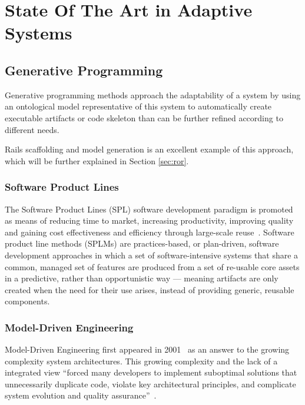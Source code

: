 \chapter{State Of The Art in Adaptive Systems}\label{chap:sota}

\section{Generative Programming}\label{sec:generative_programming}

Generative programming methods approach the adaptability of a system by using an ontological model representative of this system to automatically create executable artifacts or code skeleton than can be further refined according to different needs.

Rails scaffolding and model generation is an excellent example of this approach, which will be further explained in Section \ref{sec:ror}.

\subsection{Software Product Lines}

The Software Product Lines (SPL) software development paradigm is promoted as means of reducing time to market, increasing productivity, improving quality and gaining cost effectiveness and efficiency through large-scale reuse~\cite{TC06}. Software product line methods (SPLMs) are practices-based, or plan-driven, software development approaches in which a set of software-intensive systems that share a common, managed set of features are produced from a set of re-usable core assets in a predictive, rather than opportunistic way --- meaning artifacts are only created when the need for their use arises, instead of providing generic, reusable components.


\subsection{Model-Driven Engineering}\label{sec:mda}

Model-Driven Engineering first appeared in 2001~\cite{Mil03} as an answer to the growing complexity system architectures. This growing complexity and the lack of a integrated view ``forced many developers to implement suboptimal solutions that unnecessarily duplicate code, violate key architectural principles, and complicate system evolution and quality assurance''~\cite{Sch06}.

